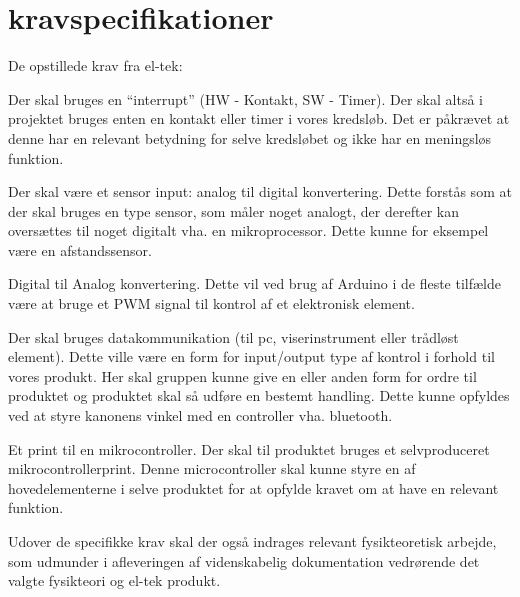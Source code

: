 \section{kravspecifikationer}

De opstillede krav fra el-tek:

Der skal bruges en “interrupt” (HW - Kontakt, SW - Timer).
Der skal altså i projektet bruges enten en kontakt eller timer i vores kredsløb. Det er påkrævet at denne har en relevant betydning for selve kredsløbet og ikke har en meningsløs funktion.

Der skal være et sensor input: analog til digital konvertering.
Dette forstås som at der skal bruges en type sensor, som måler noget analogt, der derefter kan oversættes til noget digitalt vha. en mikroprocessor. Dette kunne for eksempel være en afstandssensor.

Digital til Analog konvertering.
Dette vil ved brug af Arduino i de fleste tilfælde være at bruge et PWM signal til kontrol af et elektronisk element.

Der skal bruges datakommunikation (til pc, viserinstrument eller trådløst element).
Dette ville være en form for input/output type af kontrol i forhold til vores produkt. Her skal gruppen kunne give en eller anden form for ordre til produktet og produktet skal så udføre en bestemt handling. Dette kunne opfyldes ved at styre kanonens vinkel med en controller vha. bluetooth.

Et print til en mikrocontroller.
Der skal til produktet bruges et selvproduceret mikrocontrollerprint. Denne microcontroller skal kunne styre en af hovedelementerne i selve produktet for at opfylde kravet om at have en relevant funktion.

Udover de specifikke krav skal der også indrages relevant fysikteoretisk arbejde, som udmunder i afleveringen af videnskabelig dokumentation vedrørende det valgte fysikteori og el-tek produkt.
